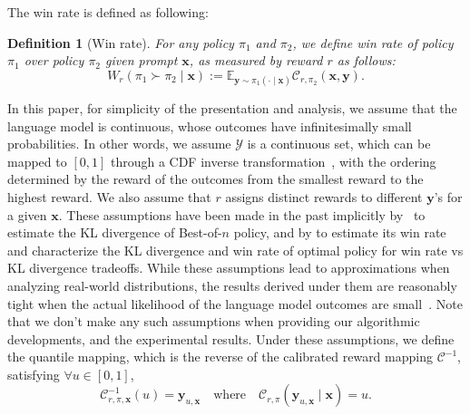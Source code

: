 \documentclass{article}
\newcommand{\by}{{\bm{y}}}
\newcommand{\bx}{{\bm{x}}}
\newcommand{\bcY}{{\bm{\mathcal{Y}}}}
\newcommand{\E}{\mathbb{E}}
\newcommand{\op}{\pi} %
\newcommand{\qt}{\mathcal{C}}
\newtheorem{definition}{Definition}
\begin{document}
The win rate is defined as following:
%

\begin{definition}[Win rate]\label{def:win_rate}
%
For any policy $\pi_1$ and $\pi_2$, we define win rate of policy $\pi_1$ over policy $\pi_2$ given prompt $\bx$, as measured by reward $r$ as follows:
\begin{equation} 
     W_r(\pi_1 \succ \pi_2 \mid \bx) := \E_{\by \sim \op_1(\cdot\mid \bx)} \qt_{r, \pi_2}(\bx, \by).
\end{equation}
%
%
%
%
%
%
%
\end{definition}


In this paper, for simplicity of the presentation and analysis, we assume that the language model is continuous, whose outcomes have infinitesimally small probabilities.
In other words, we assume $\bcY$ is a continuous set, which can be mapped to $[0, 1]$ through a CDF inverse transformation~\citep{Rosenblatt1952}, with the ordering determined by the reward of the outcomes from the smallest reward to the highest reward.
%
We also assume that $r$ assigns distinct rewards to different $\by$'s for a given $\bx$. 
These assumptions have been made in the past implicitly by~\cite{hilton2022measuring} to estimate the KL divergence of Best-of-$n$ policy, and by \cite{gui2024bonbonalignmentlargelanguage} to estimate its win rate and characterize the KL divergence and win rate of optimal policy for win rate vs KL divergence tradeoffs. While these assumptions lead to approximations when analyzing real-world distributions, the results derived under them are reasonably tight when the actual likelihood of the language model outcomes are small~\citep{beirami2024theoretical}. %
Note that we don't make any such assumptions when providing our algorithmic developments, and the experimental results.
%
%
%
%
%
%
%
Under these assumptions, we define the quantile mapping, which is the reverse of the calibrated reward mapping $\qt^{-1}$, satisfying $\forall u \in [0,1]$, %
$$\qt^{-1}_{r, \pi, \bx} (u) = \by_{u, \bx} \quad \text{where} \quad \qt_{r, \pi} (\by_{u, \bx} \mid \bx) = u.$$
\end{document}
